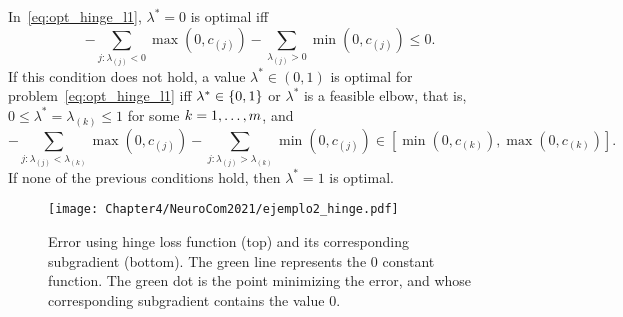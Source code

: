 \begin{prop}\label{prop:hinge_neurocom2020}
    In~\eqref{eq:opt_hinge_l1}, $\lambda^*=0$ is optimal iff
    \begin{equation}\label{eq:sol_hinge_0}
        -\sum_{j: \lambda_{(j)}<0} \max(0, c_{(j)}) - \sum_{\lambda_{(j)}>0} \min(0, c_{(j)}) \leq 0 .
        \end{equation}
        If this condition does not hold, a value $\lambda^* \in (0, 1)$ is optimal for problem~\eqref{eq:opt_hinge_l1} iff $\lambda^* \in \left\{0, 1\right\}$ or $\lambda^*$ is a feasible elbow, that is, $0 \leq \lambda^* = \lambda_{(k)} \leq 1$ for some $k=1, \dotsc, m$, and
    \begin{equation}\label{eq:sol_hinge}
        -\sum_{j: \lambda_{(j)}< \lambda_{(k)}} \max(0, c_{(j)}) - \sum_{j: \lambda_{(j)}>  \lambda_{(k)}} \min(0, c_{(j)}) \in \left[\min(0, c_{(k)}), \max(0, c_{(k)}) \right] .
    \end{equation}
    If none of the previous conditions hold, then $\lambda^*=1$ is optimal.
\end{prop}
\begin{figure}[t!]
    \centering
    \texttt{[image: Chapter4/NeuroCom2021/ejemplo2\_hinge.pdf]}
    \caption{Error using hinge loss function (top) and its corresponding subgradient (bottom). The green line represents the $0$ constant function. The green dot is the point minimizing the error, and whose corresponding subgradient contains the value $0$.}
    \label{fig:hinge_error}
\end{figure}

